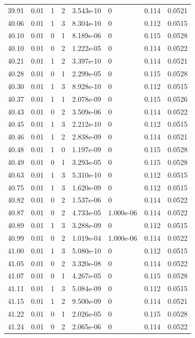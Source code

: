 \documentclass[preview]{standalone}
\begin{document}
{{{{{{{{{{{{{{{{{\begin{tabular}{L{1.2cm}C{1.2cm} C{0.3cm}C{0.5cm} C{1.4cm}C{1.4cm} C{1.4cm}C{1.4cm}}
  39.91  &  0.01  & 1     &  2 &  3.543e-10  & 0  & 0.114 &  0.0521   \\ 
  40.06  &  0.01  & 1     &  3 &  8.304e-10  & 0  & 0.112 &  0.0515   \\ 
  40.10  &  0.01  & 0     &  1 &  8.189e-06  & 0  & 0.115 &  0.0528   \\ 
  40.10  &  0.01  & 0     &  2 &  1.222e-05  & 0  & 0.114 &  0.0522   \\ 
  40.21  &  0.01  & 1     &  2 &  3.397e-10  & 0  & 0.114 &  0.0521   \\ 
  40.28  &  0.01  & 0     &  1 &  2.299e-05  & 0  & 0.115 &  0.0528   \\ 
  40.30  &  0.01  & 1     &  3 &  8.928e-10  & 0  & 0.112 &  0.0515   \\ 
  40.37  &  0.01  & 1     &  1 &  2.078e-09  & 0  & 0.115 &  0.0526   \\ 
  40.43  &  0.01  & 0     &  2 &  3.509e-06  & 0  & 0.114 &  0.0522   \\ 
  40.45  &  0.01  & 1     &  3 &  2.212e-10  & 0  & 0.112 &  0.0515   \\ 
  40.46  &  0.01  & 1     &  2 &  2.838e-09  & 0  & 0.114 &  0.0521   \\ 
  40.48  &  0.01  & 1     &  0 &  1.197e-09  & 0  & 0.115 &  0.0528   \\ 
  40.49  &  0.01  & 0     &  1 &  3.293e-05  & 0  & 0.115 &  0.0528   \\ 
  40.63  &  0.01  & 1     &  3 &  5.310e-10  & 0  & 0.112 &  0.0515   \\ 
  40.75  &  0.01  & 1     &  3 &  1.620e-09  & 0  & 0.112 &  0.0515   \\ 
  40.82  &  0.01  & 0     &  2 &  1.537e-06  & 0  & 0.114 &  0.0522   \\ 
  40.87  &  0.01  & 0     &  2 &  4.733e-05  & 1.000e-06  & 0.114 &  0.0522   \\ 
  40.89  &  0.01  & 1     &  3 &  3.288e-09  & 0  & 0.112 &  0.0515   \\ 
  40.99  &  0.01  & 0     &  2 &  1.019e-04  & 1.000e-06  & 0.114 &  0.0522   \\ 
  41.00  &  0.01  & 1     &  3 &  5.080e-10  & 0  & 0.112 &  0.0515   \\ 
  41.05  &  0.01  & 0     &  2 &  3.320e-08  & 0  & 0.114 &  0.0522   \\ 
  41.07  &  0.01  & 0     &  1 &  4.267e-05  & 0  & 0.115 &  0.0528   \\ 
  41.11  &  0.01  & 1     &  3 &  5.084e-09  & 0  & 0.112 &  0.0515   \\ 
  41.15  &  0.01  & 1     &  2 &  9.500e-09  & 0  & 0.114 &  0.0521   \\ 
  41.22  &  0.01  & 0     &  1 &  2.026e-05  & 0  & 0.115 &  0.0528   \\ 
  41.24  &  0.01  & 0     &  2 &  2.065e-06  & 0  & 0.114 &  0.0522   \\ 
\hline 
\end{tabular} 

}}}}}}}}}}}}}}}}}
\end{document}
